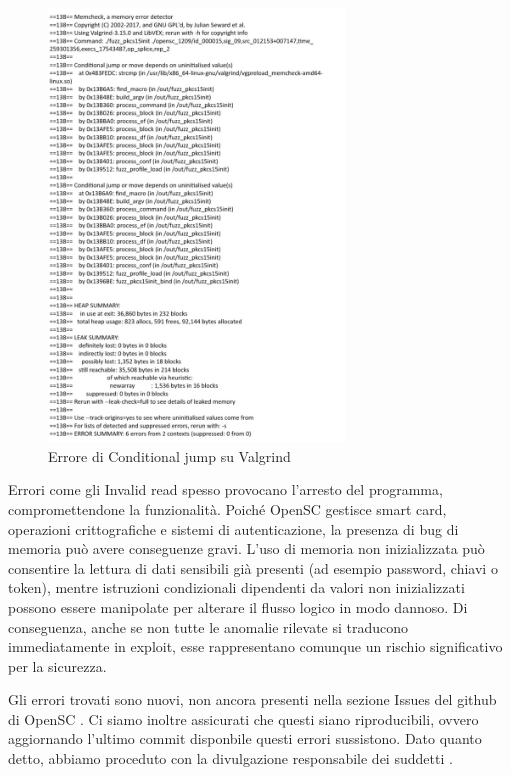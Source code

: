 \begin{figure}[htbp]        
  \centering               
  \includegraphics[width=0.7\textwidth]{immagini/valgrind-error.jpg}  
  \caption{Errore di Conditional jump su Valgrind}  
  \label{fig:valgrind-error}      
\end{figure}

Errori come gli Invalid read spesso provocano l’arresto del programma, compromettendone la funzionalità. Poiché OpenSC gestisce smart card, operazioni crittografiche e sistemi di autenticazione, la presenza di bug di memoria può avere conseguenze gravi. L’uso di memoria non inizializzata può consentire la lettura di dati sensibili già presenti (ad esempio password, chiavi o token), mentre istruzioni condizionali dipendenti da valori non inizializzati possono essere manipolate per alterare il flusso logico in modo dannoso. Di conseguenza, anche se non tutte le anomalie rilevate si traducono immediatamente in exploit, esse rappresentano comunque un rischio significativo per la sicurezza.

Gli errori trovati sono nuovi, non ancora presenti nella sezione Issues del github di OpenSC \cite{ref25}. Ci siamo inoltre assicurati che questi siano riproducibili, ovvero aggiornando l'ultimo commit disponbile questi errori sussistono. Dato quanto detto, abbiamo proceduto con la divulgazione responsabile dei suddetti \cite{ref23}.
